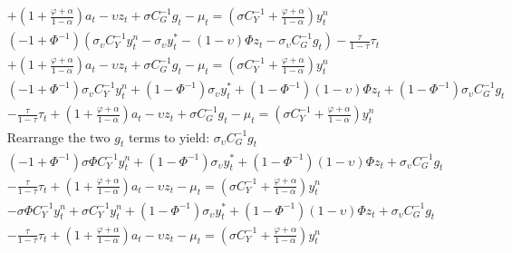 \begin{align}
        &+ \left(1 + \frac{\varphi + \alpha}{1-\alpha}\right)a_t - \upsilon z_t + \sigma C_G^{-1} g_t-\mu_t = \left(\sigma C_Y^{-1} + \frac{\varphi + \alpha}{1-\alpha}\right)y^n_t\\
    &(- 1 + \Phi^{-1}) (\sigma_\upsilon C_Y^{-1} y^n_t - \sigma_\upsilon y^*_t - (1-\upsilon)\Phi z_t- \sigma_\upsilon C_G^{-1} g_t) - \frac{\tau}{1-\tau}\tau_t  \nonumber \\
        &+ \left(1 + \frac{\varphi + \alpha}{1-\alpha}\right)a_t - \upsilon z_t + \sigma C_G^{-1} g_t-\mu_t = \left(\sigma C_Y^{-1} + \frac{\varphi + \alpha}{1-\alpha}\right)y^n_t\\
    &(- 1 + \Phi^{-1})\sigma_\upsilon C_Y^{-1} y^n_t +(1 - \Phi^{-1}) \sigma_\upsilon y^*_t + (1 - \Phi^{-1}) (1-\upsilon)\Phi z_t + (1 - \Phi^{-1}) \sigma_\upsilon C_G^{-1} g_t \nonumber \\
        &- \frac{\tau}{1-\tau}\tau_t  + \left(1 + \frac{\varphi + \alpha}{1-\alpha}\right)a_t - \upsilon z_t + \sigma C_G^{-1} g_t -\mu_t = \left(\sigma C_Y^{-1} + \frac{\varphi + \alpha}{1-\alpha}\right)y^n_t\\
    &\text{Rearrange the two $g_t$ terms to yield: $\sigma_\upsilon C_G^{-1}g_t$} \nonumber\\
    &(- 1 + \Phi^{-1})\sigma \Phi C_Y^{-1} y^n_t +(1 - \Phi^{-1}) \sigma_\upsilon y^*_t + (1 - \Phi^{-1}) (1-\upsilon)\Phi z_t + \sigma_\upsilon C_G^{-1} g_t \nonumber \\
        &- \frac{\tau}{1-\tau}\tau_t  + \left(1 + \frac{\varphi + \alpha}{1-\alpha}\right)a_t - \upsilon z_t -\mu_t = \left(\sigma C_Y^{-1} + \frac{\varphi + \alpha}{1-\alpha}\right)y^n_t\\
    &-\sigma \Phi C_Y^{-1} y^n_t + \sigma C_Y^{-1} y^n_t +(1 - \Phi^{-1}) \sigma_\upsilon y^*_t + (1 - \Phi^{-1}) (1-\upsilon)\Phi z_t + \sigma_\upsilon C_G^{-1} g_t \nonumber \\
        &- \frac{\tau}{1-\tau}\tau_t  + \left(1 + \frac{\varphi + \alpha}{1-\alpha}\right)a_t - \upsilon z_t -\mu_t = \left(\sigma C_Y^{-1} + \frac{\varphi + \alpha}{1-\alpha}\right)y^n_t
\end{align}
